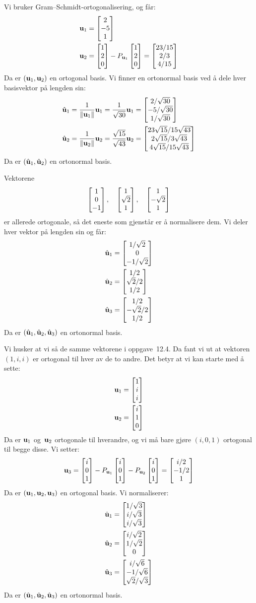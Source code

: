 \begin{losning}
\begin{punkt}
Vi bruker Gram--Schmidt-ortogonalisering, og får:
\begin{align*}
\mathbf{u}_1 &= \begin{bmatrix} 2 \\ -5 \\ 1 \end{bmatrix} \\
\mathbf{u}_2 &= \begin{bmatrix} 1 \\ 2 \\ 0 \end{bmatrix} - P_{\mathbf{u}_1} \begin{bmatrix} 1 \\ 2 \\ 0 \end{bmatrix}
      = \begin{bmatrix} 23/15 \\ 2/3 \\ 4/15 \end{bmatrix}
\end{align*}
Da er $(\mathbf{u}_1,\mathbf{u}_2)$ en ortogonal basis.  Vi finner en ortonormal basis
ved å dele hver basisvektor på lengden sin:
\begin{align*}
\hat{\mathbf{u}}_1
&= \frac{1}{\|\mathbf{u}_1\|} \mathbf{u}_1
 = \frac{1}{\sqrt{30}} \mathbf{u}_1
 = \begin{bmatrix} 2/\sqrt{30} \\ -5/\sqrt{30} \\ 1/\sqrt{30} \end{bmatrix} \\
\hat{\mathbf{u}}_2
&= \frac{1}{\|\mathbf{u}_2\|} \mathbf{u}_2
 = \frac{\sqrt{15}}{\sqrt{43}} \mathbf{u}_2
 = \begin{bmatrix} 23 \sqrt{15} / 15 \sqrt{43} \\ 2 \sqrt{15} / 3 \sqrt{43} \\ 4 \sqrt{15} / 15 \sqrt{43} \end{bmatrix}
\end{align*}
Da er $(\hat{\mathbf{u}}_1, \hat{\mathbf{u}}_2)$ en ortonormal basis.
\end{punkt}

\begin{punkt}
Vektorene
\[
\begin{bmatrix} 1 \\ 0 \\ -1 \end{bmatrix},\quad
\begin{bmatrix} 1 \\ \sqrt{2} \\ 1 \end{bmatrix},\quad
\begin{bmatrix} 1 \\ -\sqrt{2} \\ 1 \end{bmatrix}
\]
er allerede ortogonale, så det eneste som gjenstår er å normalisere
dem.  Vi deler hver vektor på lengden sin og får:
\begin{align*}
\hat{\mathbf{u}}_1 &= \begin{bmatrix} 1/\sqrt{2} \\ 0 \\ -1/\sqrt{2} \end{bmatrix} \\
\hat{\mathbf{u}}_2 &= \begin{bmatrix} 1/2 \\ \sqrt{2}/2 \\ 1/2 \end{bmatrix} \\
\hat{\mathbf{u}}_3 &= \begin{bmatrix} 1/2 \\ -\sqrt{2}/2 \\ 1/2 \end{bmatrix}
\end{align*}
Da er $(\hat{\mathbf{u}}_1, \hat{\mathbf{u}}_2, \hat{\mathbf{u}}_3)$ en ortonormal basis.
\end{punkt}

\begin{punkt}
Vi husker at vi så de samme vektorene i oppgave~12.4. %
Da fant vi ut at vektoren $(1,i,i)$ er ortogonal til hver av de to andre.
Det betyr at vi kan starte med å sette:
\begin{align*}
\mathbf{u}_1 &= \begin{bmatrix} 1 \\ i \\ i \end{bmatrix} \\
\mathbf{u}_2 &= \begin{bmatrix} i \\ 1 \\ 0 \end{bmatrix}
\end{align*}
Da er $\mathbf{u}_1$ og~$\mathbf{u}_2$ ortogonale til hverandre, og vi må bare
gjøre $(i,0,1)$ ortogonal til begge disse.  Vi setter:
\[
\mathbf{u}_3
 = \begin{bmatrix} i \\ 0 \\ 1 \end{bmatrix} - P_{\mathbf{u}_1} \begin{bmatrix} i \\ 0 \\ 1 \end{bmatrix} - P_{\mathbf{u}_2} \begin{bmatrix} i \\ 0 \\ 1 \end{bmatrix}
 = \begin{bmatrix} i/2 \\ -1/2 \\ 1 \end{bmatrix}
\]
Da er $(\mathbf{u}_1, \mathbf{u}_2, \mathbf{u}_3)$ en ortogonal basis.  Vi normaliserer:
\begin{align*}
\hat{\mathbf{u}}_1 &= \begin{bmatrix} 1/\sqrt{3} \\ i/\sqrt{3} \\ i/\sqrt{3} \end{bmatrix} \\
\hat{\mathbf{u}}_2 &= \begin{bmatrix} i/\sqrt{2} \\ 1/\sqrt{2} \\ 0 \end{bmatrix} \\
\hat{\mathbf{u}}_3 &= \begin{bmatrix} i/\sqrt{6} \\ -1/\sqrt{6} \\ \sqrt{2}/\sqrt{3} \end{bmatrix}
\end{align*}
Da er $(\hat{\mathbf{u}}_1, \hat{\mathbf{u}}_2, \hat{\mathbf{u}}_3)$ en ortonormal basis.
\end{punkt}
\end{losning}



